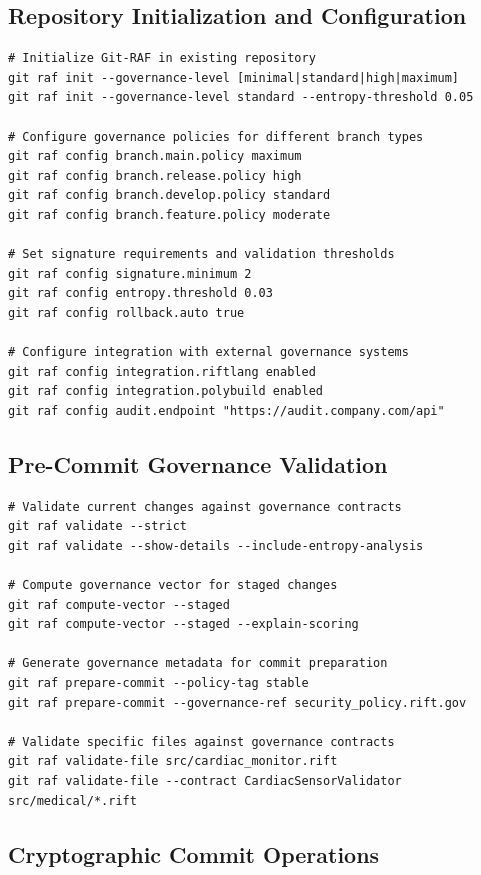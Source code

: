 \documentclass[11pt,letterpaper]{article}
\begin{document}
\subsection{Repository Initialization and Configuration}

\begin{lstlisting}[language=shell, caption=Git-RAF Repository Setup Commands]
# Initialize Git-RAF in existing repository
git raf init --governance-level [minimal|standard|high|maximum]
git raf init --governance-level standard --entropy-threshold 0.05

# Configure governance policies for different branch types
git raf config branch.main.policy maximum
git raf config branch.release.policy high
git raf config branch.develop.policy standard
git raf config branch.feature.policy moderate

# Set signature requirements and validation thresholds
git raf config signature.minimum 2
git raf config entropy.threshold 0.03
git raf config rollback.auto true

# Configure integration with external governance systems
git raf config integration.riftlang enabled
git raf config integration.polybuild enabled
git raf config audit.endpoint "https://audit.company.com/api"
\end{lstlisting}

\subsection{Pre-Commit Governance Validation}

\begin{lstlisting}[language=shell, caption=Pre-Commit Validation Commands]
# Validate current changes against governance contracts
git raf validate --strict
git raf validate --show-details --include-entropy-analysis

# Compute governance vector for staged changes
git raf compute-vector --staged
git raf compute-vector --staged --explain-scoring

# Generate governance metadata for commit preparation
git raf prepare-commit --policy-tag stable
git raf prepare-commit --governance-ref security_policy.rift.gov

# Validate specific files against governance contracts
git raf validate-file src/cardiac_monitor.rift
git raf validate-file --contract CardiacSensorValidator src/medical/*.rift
\end{lstlisting}

\subsection{Cryptographic Commit Operations}
\end{document}
